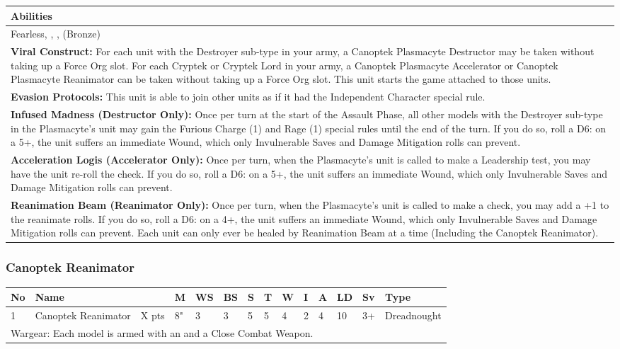 \noindent
\begin{tabular}{||m{532pt}||}
	\hline
	Abilities \\
	\hline
	Fearless, \quickref{Living Metal}, \quickref{Reanimation Protocols}, \quickref{Soulless Hordes} (Bronze) \\
	\textbf{Viral Construct:} For each unit with the Destroyer sub-type in your army, a Canoptek Plasmacyte Destructor may be taken without taking up a Force Org slot. For each Cryptek or Cryptek Lord in your army, a Canoptek Plasmacyte Accelerator or Canoptek Plasmacyte Reanimator can be taken without taking up a Force Org slot. This unit starts the game attached to those units. \\
	\textbf{Evasion Protocols:} This unit is able to join other units as if it had the Independent Character special rule. \\
	\textbf{Infused Madness (Destructor Only):} Once per turn at the start of the Assault Phase, all other models with the Destroyer sub-type in the Plasmacyte's unit may gain the Furious Charge (1) and Rage (1) special rules until the end of the turn. If you do so, roll a D6: on a 5+, the unit suffers an immediate Wound, which only Invulnerable Saves and Damage Mitigation rolls can prevent. \\
	\textbf{Acceleration Logis (Accelerator Only):} Once per turn, when the Plasmacyte's unit is called to make a Leadership test, you may have the unit re-roll the check. If you do so, roll a D6: on a 5+, the unit suffers an immediate Wound, which only Invulnerable Saves and Damage Mitigation rolls can prevent. \\
	\textbf{Reanimation Beam (Reanimator Only):} Once per turn, when the Plasmacyte's unit is called to make a \quickref{Reanimation Protocols} check, you may add a +1 to the reanimate rolls. If you do so, roll a D6: on a 4+, the unit suffers an immediate Wound, which only Invulnerable Saves and Damage Mitigation rolls can prevent. Each unit can only ever be healed by Reanimation Beam at a time (Including the Canoptek Reanimator).\\
	\hline
\end{tabular}


\newpage
\subsubsection{Canoptek Reanimator}

\noindent
\begin{tabular}{||m{10pt} m{95pt} m{30pt} m{11pt} m{11pt} m{11pt} m{11pt} m{11pt} m{11pt} m{11pt} m{11pt} m{11pt} m{11pt} m{125pt}||}
	\hline
	No & Name & & M & WS & BS & S & T & W & I & A & LD & Sv & Type \\
	\hline
	1 & Canoptek Reanimator & X pts & 8" & 3 & 3 & 5 & 5 & 4 & 2 & 4 & 10 & 3+ & Dreadnought \\
	\hline
	\hline
	\multicolumn{14}{||Z{532 pt}||}{Wargear: Each model is armed with an \quickref{Atomiser Beam Lance} and a Close Combat Weapon.} \\
	\hline
\end{tabular}

